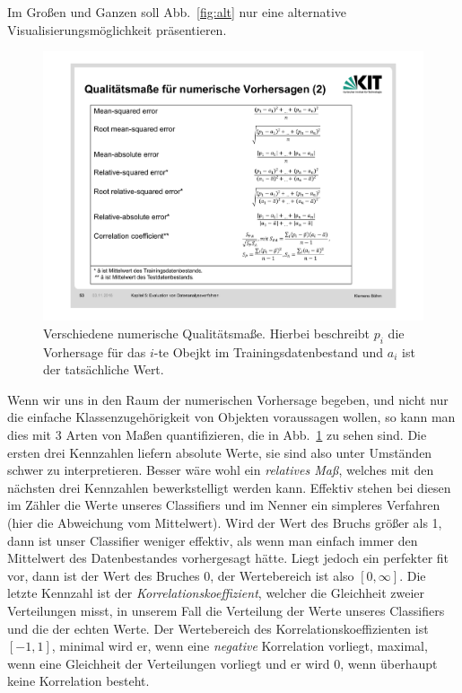 Im Großen und Ganzen soll Abb.~\ref{fig:alt} nur eine alternative 
Visualisierungsmöglichkeit präsentieren.

\begin{figure}[ht]
	\centering
	\includegraphics[width=\textwidth]{Figures/numeric_measures}
	\caption[Numeric Measures]{Verschiedene numerische Qualitätsmaße. Hierbei beschreibt
	\(p_i\) die Vorhersage für das \(i\)-te Obejkt im Trainingsdatenbestand
	und \(a_i\) ist der tatsächliche Wert.\footnotemark}
	\label{fig:numeric}
\end{figure}

Wenn wir uns in den Raum der numerischen Vorhersage begeben, und nicht nur die 
einfache Klassenzugehörigkeit von Objekten voraussagen wollen, so kann man 
dies mit 3 Arten von Maßen quantifizieren, die in Abb.~\ref{fig:numeric} zu
sehen sind. Die ersten drei Kennzahlen liefern absolute Werte, sie sind also unter
Umständen schwer zu interpretieren. Besser wäre wohl ein \textit{relatives Maß}, welches mit
den nächsten drei Kennzahlen bewerkstelligt werden kann. Effektiv stehen bei diesen 
im Zähler die Werte unseres Classifiers und im Nenner ein simpleres Verfahren (hier
die Abweichung vom Mittelwert). Wird der Wert des Bruchs größer als 1, dann 
ist unser Classifier weniger effektiv, als wenn man einfach immer den Mittelwert
des Datenbestandes vorhergesagt hätte. Liegt jedoch ein perfekter fit vor, dann
ist der Wert des Bruches 0, der Wertebereich ist also \([0,\infty]\). Die letzte 
Kennzahl ist der \textit{Korrelationskoeffizient}, welcher die Gleichheit zweier
Verteilungen misst, in unserem Fall die Verteilung der Werte unseres Classifiers
und die der echten Werte. Der Wertebereich des Korrelationskoeffizienten ist
\([-1,1]\), minimal wird er, wenn eine \textit{negative} Korrelation vorliegt,
maximal, wenn eine Gleichheit der Verteilungen vorliegt und er wird 0, wenn überhaupt
keine Korrelation besteht.

